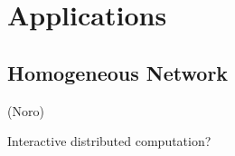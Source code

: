 
\section{Applications}
\subsection{Homogeneous Network}  (Noro)

Interactive distributed computation?
